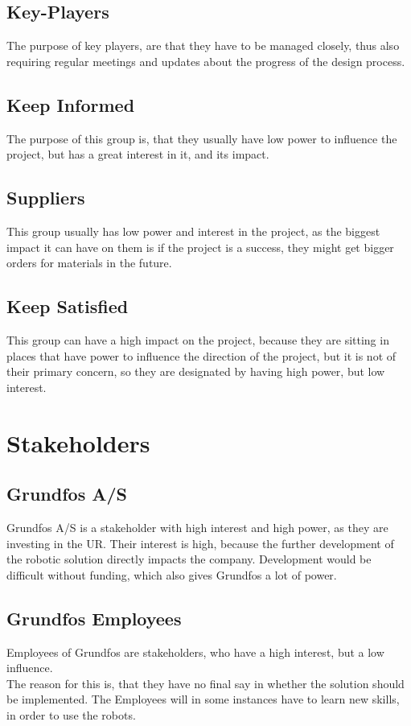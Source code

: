 \subsection{Key-Players}
The purpose of key players, are that they have to be managed closely, thus also requiring regular meetings and updates about the progress of the design process.\\

\subsection{Keep Informed}
The purpose of this group is, that they usually have low power to influence the project, but has a great interest in it, and its impact.

\subsection{Suppliers}
This group usually has low power and interest in the project, as the biggest impact it can have on them is if the project is a success, they might get bigger orders for materials in the future.

\subsection{Keep Satisfied}
This group can have a high impact on the project, because they are sitting in places that have power to influence the direction of the project, but it is not of their primary concern, so they are designated by having high power, but low interest.

\section{Stakeholders}\label{ch:Stakeholders-main}

\subsection{Grundfos A/S}\label{ch:grundfosas-stake}
Grundfos A/S is a stakeholder with high interest and high power, as they are investing in the UR. Their interest is high, because the further development of the robotic solution directly impacts the company. Development would be difficult without funding, which also gives Grundfos a lot of power. 

\subsection{Grundfos Employees}\label{ch:grundfosemp-stake}
Employees of Grundfos are stakeholders, who have a high interest, but a low influence.\\ The reason for this is, that they have no final say in whether the solution should be implemented. The Employees will in some instances have to learn new skills, in order to use the robots.

